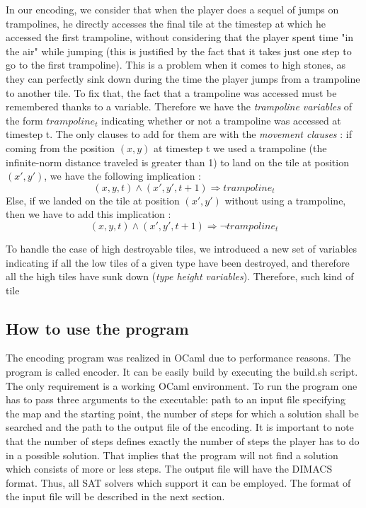 \documentclass[a4paper, 12pt, titlepage]{article}
\begin{document}
In our encoding, we consider that when the player does a sequel of jumps on
trampolines, he directly accesses the final tile at the timestep at which he
accessed the first trampoline, without considering that the player spent time
"in the air" while jumping (this is justified by the fact that it takes just one
step to go to the first trampoline). This is a problem when it comes to high
stones, as they can perfectly sink down during the time the player jumps from a
trampoline to another tile. To fix that, the fact that a trampoline was accessed
must be remembered thanks to a variable. Therefore we have the {\em trampoline
variables} of the form $trampoline_t$ indicating whether or not a trampoline was
accessed at timestep t. The only clauses to add for them are with the
{\em movement clauses} : if coming from the position $(x, y)$ at timestep t we
used a trampoline (the infinite-norm distance traveled is greater than 1) to
land on the tile at position $(x', y')$, we have the following implication :
\begin{equation}
(x, y, t) \wedge (x', y', t+1) \Rightarrow trampoline_t
\end{equation}
Else, if we landed on the tile at position $(x', y')$ without using a
trampoline, then we have to add this implication :
\begin{equation}
(x, y, t) \wedge (x', y', t+1) \Rightarrow \neg trampoline_t
\end{equation}

To handle the case of high destroyable tiles, we introduced a new set of
variables indicating if all the low tiles of a given type have been destroyed,
and therefore all the high tiles have sunk down ({\em type height variables}).
Therefore, such kind of tile


\subsection{How to use the program}

The encoding program was realized in OCaml due to performance reasons. 
The program is called encoder. 
It can be easily build by executing the build.sh script. 
The only requirement is a working OCaml environment. 
To run the program one has to pass three arguments to the executable: path to an input file specifying the map and the starting point, the number of steps for which a solution shall be searched and the path to the output file of the encoding. 
It is important to note that the number of steps defines exactly the number of steps the player has to do in a possible solution. 
That implies that the program will not find a solution which consists of more or less steps. 
The output file will have the DIMACS format. 
Thus, all SAT solvers which support it can be employed. 
The format of the input file will be described in the next section.
\end{document}
